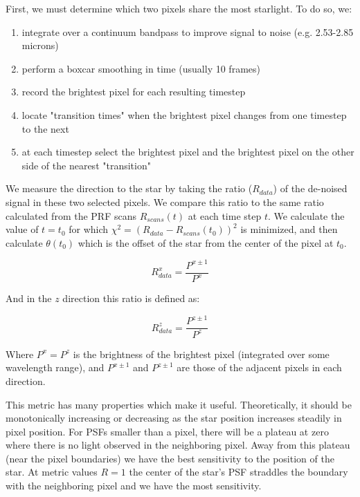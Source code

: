 \documentclass[12pt]{article}
\begin{document}
First, we must determine which two pixels share the most starlight. To do so,
we:
\begin{enumerate}
  \item integrate over a continuum bandpass to improve signal to noise (e.g. 2.53-2.85 microns)
  \item perform a boxcar smoothing in time (usually 10 frames)
  \item record the brightest pixel for each resulting timestep
  \item locate "transition times" when the brightest pixel changes from one timestep to the next
  \item at each timestep select the brightest pixel and the brightest pixel on the other side of the nearest "transition"
\end{enumerate}

We measure the direction to the star by taking the ratio ($R_{data}$) of the
de-noised signal in these two selected pixels.  We compare this ratio to the
same ratio calculated from the PRF scans $R_{scans}(t)$ at each time step $t$.
We calculate the value of $t=t_0$ for which $\chi^2 =
(R_{data}-R_{scans}(t_0))^2$ is minimized, and then calculate $\theta(t_0)$
which is the offset of the star from the center of the pixel at $t_0$. 

\begin{equation}
R_{data}^x = \frac{P^{x\pm1}}{P^{x}}
\end{equation}

And in the $z$ direction this ratio is defined as:

\begin{equation}
R_{data}^z = \frac{P^{z\pm1}}{P^{z}}
\end{equation}

Where $P^x = P^z$ is the brightness of the brightest pixel (integrated over
some wavelength range), and $P^{x\pm1}$ and $P^{z\pm1}$ are those of the
adjacent pixels in each direction.

This metric has many properties which make it useful. Theoretically, it should
be monotonically increasing or decreasing as the star position increases
steadily in pixel position.  For PSFs smaller than a pixel, there will be a
plateau at zero where there is no light observed in the neighboring pixel. Away
from this plateau (near the pixel boundaries) we have the best sensitivity to
the position of the star. At metric values $R = 1$ the center of the star's PSF
straddles the boundary with the neighboring pixel and we have the most
sensitivity.
\end{document}
